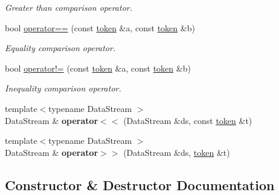 \begin{DoxyCompactItemize}
\begin{DoxyCompactList}\small\item\em Greater than comparison operator. \end{DoxyCompactList}\item 
bool \mbox{\hyperlink{classaacio_1_1token_ac4ae7b7680fa4bd2c09be5c29571dd91}{operator==}} (const \mbox{\hyperlink{classaacio_1_1token}{token}} \&a, const \mbox{\hyperlink{classaacio_1_1token}{token}} \&b)
\begin{DoxyCompactList}\small\item\em Equality comparison operator. \end{DoxyCompactList}\item 
bool \mbox{\hyperlink{classaacio_1_1token_a688813be9dc1e8f175d19ef1ffca4f6e}{operator!=}} (const \mbox{\hyperlink{classaacio_1_1token}{token}} \&a, const \mbox{\hyperlink{classaacio_1_1token}{token}} \&b)
\begin{DoxyCompactList}\small\item\em Inequality comparison operator. \end{DoxyCompactList}\item 
\mbox{\label{classaacio_1_1token_a052de4518d1e623762edddc26e50df08}} 
{\footnotesize template$<$typename Data\+Stream $>$ }\\Data\+Stream \& {\bfseries operator$<$$<$} (Data\+Stream \&ds, const \mbox{\hyperlink{classaacio_1_1token}{token}} \&t)
\item 
\mbox{\label{classaacio_1_1token_a7230d1169afe2f991e0bd87034fbb02e}} 
{\footnotesize template$<$typename Data\+Stream $>$ }\\Data\+Stream \& {\bfseries operator$>$$>$} (Data\+Stream \&ds, \mbox{\hyperlink{classaacio_1_1token}{token}} \&t)
\end{DoxyCompactItemize}


\subsection{Constructor \& Destructor Documentation}
\mbox{\label{classaacio_1_1token_acfe8cff6ca7f030b2598b0d73281a43f}} 
